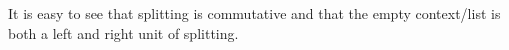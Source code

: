 It is easy to see that splitting is commutative and that the empty context/list
is both a left and right unit of splitting.

\begin{code}%
\>[0]%
\>[10]\AgdaSymbol{:}\AgdaSpace{}%
\AgdaSpace{}%
\AgdaSpace{}%
\AgdaSymbol{\}}\AgdaSpace{}%
\AgdaSpace{}%
\AgdaSpace{}%
\AgdaSpace{}%
\AgdaSpace{}%
\AgdaOperator{\AgdaDatatype{+}}\AgdaSpace{}%
\AgdaSpace{}%
\AgdaSpace{}%
\AgdaSpace{}%
\AgdaSpace{}%
\AgdaSpace{}%
\AgdaOperator{\AgdaDatatype{+}}\AgdaSpace{}%
\<%
\\
\>[0]%
\>[10]\AgdaSymbol{:}\AgdaSpace{}%
\AgdaSymbol{\}}\AgdaSpace{}%
\AgdaSpace{}%
\AgdaSpace{}%
\AgdaSpace{}%
\AgdaInductiveConstructor{[]}\AgdaSpace{}%
\AgdaOperator{\AgdaDatatype{+}}\AgdaSpace{}%
\<%
\\
\>[0]%
\>[10]\AgdaSymbol{:}\AgdaSpace{}%
\AgdaSymbol{\}}\AgdaSpace{}%
\AgdaSpace{}%
\AgdaSpace{}%
\AgdaSpace{}%
\AgdaSpace{}%
\AgdaOperator{\AgdaDatatype{+}}\AgdaSpace{}%
\AgdaInductiveConstructor{[]}\<%
\end{code}
